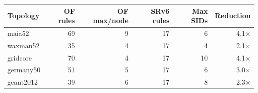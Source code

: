 \begin{tabular}{@{}lrrrrr@{}}
\toprule
Topology & OF rules & OF max/node & SRv6 rules & Max SIDs & Reduction\\
\midrule
maia52 & 69 & 9 & 17 & 6 & 4.1$\times$\\
waxman52 & 35 & 4 & 17 & 4 & 2.1$\times$\\
gridcore & 70 & 4 & 17 & 10 & 4.1$\times$\\
germany50 & 51 & 5 & 17 & 6 & 3.0$\times$\\
geant2012 & 39 & 6 & 17 & 8 & 2.3$\times$\\
\bottomrule
\end{tabular}
